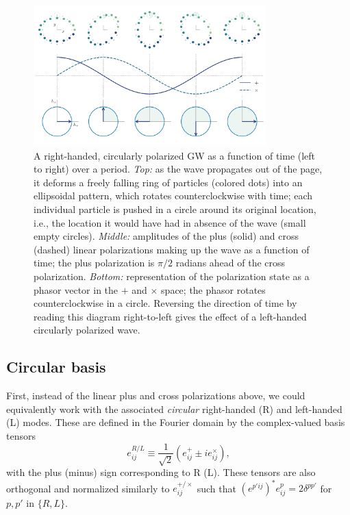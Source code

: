 \documentclass[aps,prd,twocolumn,superscriptaddress,preprintnumbers,floatfix,nofootinbib]{revtex4-2}
\newcommand{\beq}{\begin{equation}}
\newcommand{\eeq}{\end{equation}}
\begin{document}
\begin{figure}
\includegraphics[width=0.8\textwidth]{pol_diagram_circ}
\caption{A right-handed, circularly polarized GW as a function of time (left to right) over a period. \emph{Top:} as the wave propagates out of the page, it deforms a freely falling ring of particles (colored dots) into an ellipsoidal pattern, which rotates counterclockwise with time; each individual particle is pushed in a circle around its original location, i.e., the location it would have had in absence of the wave (small empty circles).
\emph{Middle:} amplitudes of the plus (solid) and cross (dashed) linear polarizations making up the wave as a function of time; the plus polarization is $\pi/2$ radians ahead of the cross polarization.
\emph{Bottom:} representation of the polarization state as a phasor vector in the $+$ and $\times$ space; the phasor rotates counterclockwise in a circle.
Reversing the direction of time by reading this diagram right-to-left gives the effect of a left-handed circularly polarized wave.
}
\label{fig:pol_diagram_circ}
\end{figure}

\subsection{Circular basis}

First, instead of the linear plus and cross polarizations above, we could equivalently work with the associated \emph{circular} right-handed (R) and left-handed (L) modes.
These are defined in the Fourier domain by the complex-valued basis tensors
\beq \label{eq:circ}
e^{R/L}_{ij} \equiv \frac{1}{\sqrt{2}} \left(e^+_{ij} \pm i e^\times_{ij} \right) ,
\eeq
with the plus (minus) sign corresponding to R (L).
These tensors are also orthogonal and normalized similarly to $e^{+/\times}_{ij}$ such that $(e^{p'ij})^* e^p_{ij} = 2 \delta^{pp'}$ for $p,p'$ in $\{R,L\}$.
\end{document}
